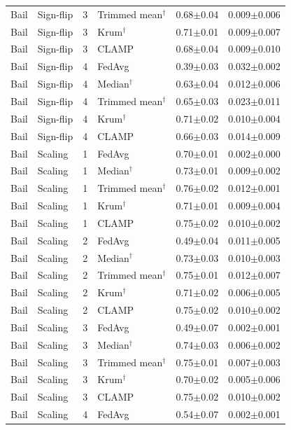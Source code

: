 \begin{longtable}{llclcc}
Bail & Sign-flip & 3 & Trimmed mean$^\dagger$ & 0.68$\pm$0.04 & 0.009$\pm$0.006 \\
Bail & Sign-flip & 3 & Krum$^\dagger$ & 0.71$\pm$0.01 & 0.009$\pm$0.007 \\
Bail & Sign-flip & 3 & CLAMP & 0.68$\pm$0.04 & 0.009$\pm$0.010 \\
Bail & Sign-flip & 4 & FedAvg & 0.39$\pm$0.03 & 0.032$\pm$0.002 \\
Bail & Sign-flip & 4 & Median$^\dagger$ & 0.63$\pm$0.04 & 0.012$\pm$0.006 \\
Bail & Sign-flip & 4 & Trimmed mean$^\dagger$ & 0.65$\pm$0.03 & 0.023$\pm$0.011 \\
Bail & Sign-flip & 4 & Krum$^\dagger$ & 0.71$\pm$0.02 & 0.010$\pm$0.004 \\
Bail & Sign-flip & 4 & CLAMP & 0.66$\pm$0.03 & 0.014$\pm$0.009 \\
Bail & Scaling & 1 & FedAvg & 0.70$\pm$0.01 & 0.002$\pm$0.000 \\
Bail & Scaling & 1 & Median$^\dagger$ & 0.73$\pm$0.01 & 0.009$\pm$0.002 \\
Bail & Scaling & 1 & Trimmed mean$^\dagger$ & 0.76$\pm$0.02 & 0.012$\pm$0.001 \\
Bail & Scaling & 1 & Krum$^\dagger$ & 0.71$\pm$0.01 & 0.009$\pm$0.004 \\
Bail & Scaling & 1 & CLAMP & 0.75$\pm$0.02 & 0.010$\pm$0.002 \\
Bail & Scaling & 2 & FedAvg & 0.49$\pm$0.04 & 0.011$\pm$0.005 \\
Bail & Scaling & 2 & Median$^\dagger$ & 0.73$\pm$0.03 & 0.010$\pm$0.003 \\
Bail & Scaling & 2 & Trimmed mean$^\dagger$ & 0.75$\pm$0.01 & 0.012$\pm$0.007 \\
Bail & Scaling & 2 & Krum$^\dagger$ & 0.71$\pm$0.02 & 0.006$\pm$0.005 \\
Bail & Scaling & 2 & CLAMP & 0.75$\pm$0.02 & 0.010$\pm$0.002 \\
Bail & Scaling & 3 & FedAvg & 0.49$\pm$0.07 & 0.002$\pm$0.001 \\
Bail & Scaling & 3 & Median$^\dagger$ & 0.74$\pm$0.03 & 0.006$\pm$0.002 \\
Bail & Scaling & 3 & Trimmed mean$^\dagger$ & 0.75$\pm$0.01 & 0.007$\pm$0.003 \\
Bail & Scaling & 3 & Krum$^\dagger$ & 0.70$\pm$0.02 & 0.005$\pm$0.006 \\
Bail & Scaling & 3 & CLAMP & 0.75$\pm$0.02 & 0.010$\pm$0.002 \\
Bail & Scaling & 4 & FedAvg & 0.54$\pm$0.07 & 0.002$\pm$0.001 \\

\end{longtable}
